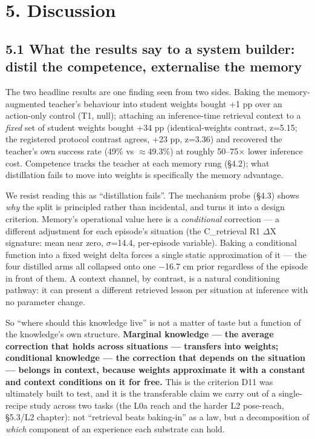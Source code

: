 

\section*{5. Discussion}

\subsection*{5.1 What the results say to a system builder: distil the competence, externalise the memory}

The two headline results are one finding seen from two sides. Baking
the memory-augmented teacher's behaviour into student weights bought
+1 pp over an action-only control (T1, null); attaching an
inference-time retrieval context to a \emph{fixed} set of student weights
bought +34 pp (identical-weights contrast, z=5.15; the registered
protocol contrast agrees, +23 pp, z=3.36) and recovered the teacher's
own success rate (49\% vs $\approx$49.3\%) at roughly 50--75$\times$ lower inference
cost. Competence tracks the teacher at each memory rung (\S4.2); what
distillation fails to move into weights is specifically the memory
advantage.

We resist reading this as ``distillation fails''. The mechanism probe
(\S4.3) shows \emph{why} the split is principled rather than incidental, and
turns it into a design criterion. Memory's operational value here is a
\emph{conditional} correction --- a different adjustment for each episode's
situation (the C\_retrieval R1 $\Delta$X signature: mean near zero, $\sigma$=14.4,
per-episode variable). Baking a conditional function into a fixed
weight delta forces a single static approximation of it --- the four
distilled arms all collapsed onto one $-$16.7 cm prior regardless of the
episode in front of them. A context channel, by contrast, is a natural
conditioning pathway: it can present a different retrieved lesson per
situation at inference with no parameter change.

So ``where should this knowledge live'' is not a matter of taste but a
function of the knowledge's own structure. \textbf{Marginal knowledge --- the
average correction that holds across situations --- transfers into
weights; conditional knowledge --- the correction that depends on the
situation --- belongs in context, because weights approximate it with a
constant and context conditions on it for free.} This is the criterion
D11 was ultimately built to test, and it is the transferable claim we
carry out of a single-recipe study across two tasks (the L0a reach and
the harder L2 pose-reach, \S5.3/L2 chapter): not ``retrieval beats
baking-in'' as a law, but a decomposition of \emph{which} component of an
experience each substrate can hold.

